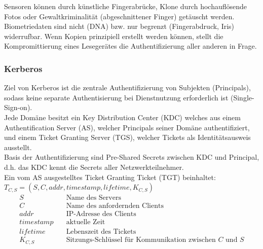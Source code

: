 \documentclass[a4paper,12pt,leqno]{article}
\begin{document}
Sensoren können durch künstliche Fingerabrücke, Klone durch hochauflösende Fotos oder Gewaltkriminalität (abgeschnittener Finger) getäuscht werden.\\
Biometriedaten sind nicht (DNA) bzw. nur begrenzt (Fingerabdruck, Iris) widerrufbar.
Wenn Kopien prinzipiell erstellt werden können, stellt die Kompromittierung eines Lesegerätes die Authentifizierung aller anderen in Frage.

\subsubsection{Kerberos}

Ziel von Kerberos ist die zentrale Authentifizierung von Subjekten (Principals), sodass keine separate Authentisierung bei Dienstnutzung erforderlich ist (Single-Sign-on).\\
Jede Domäne besitzt ein Key Distribution Center (KDC) welches aus einem Authentification Server (AS), welcher Principals seiner Domäne authentifiziert, und einem Ticket Granting Server (TGS), welcher Tickets als Identitätsausweis ausstellt.\\
Basis der Authentifizierung sind Pre-Shared Secrets zwischen KDC und Principal, d.h. das KDC kennt die Secrets aller Netzwerkteilnehmer.\\

Ein vom AS ausgestelltes Ticket Granting Ticket (TGT) beinhaltet:\\
$T_{C,S}= (S,C,addr,timestamp,lifetime,K_{C,S})$
\begin{align*}
S & \quad\textrm{Name des Servers}\\
C & \quad\textrm{Name des anfordernden Clients}\\
addr &\quad \textrm{IP-Adresse des Clients}\\
timestamp &\quad  \textrm{aktuelle Zeit}\\
lifetime &\quad \textrm{Lebenszeit des Tickets}\\
K_{C,S} &\quad \textrm{Sitzungs-Schlüssel für Kommunikation zwischen $C$ und $S$}
\end{align*}
\end{document}
